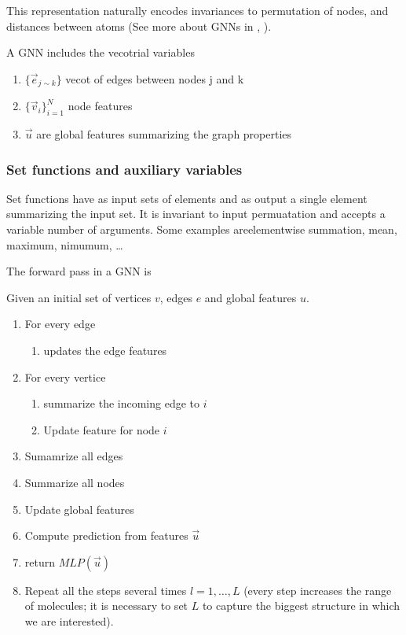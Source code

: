 \documentclass[b5paper]{report}
\begin{document}
This representation naturally encodes invariances to permutation of nodes, and
distances between atoms (See more about \glspl{GNN} in \cite{scarselli2009graph},
\cite{li2018learning}).

A \gls{GNN} includes the vecotrial variables

\begin{enumerate}
  \item $\{\vec{e}_{j\sim k}\}$ vecot of edges between nodes j and k
  \item $\{\vec{v}_i\}_{i=1}^N$ node features
  \item $\vec{u}$ are global features summarizing the graph properties
\end{enumerate}

\subsubsection{Set functions and auxiliary variables}

Set functions have as input sets of elements and as output a single element
summarizing the input set. It is invariant to input permuatation and accepts a
variable number of arguments. Some examples areelementwise summation, mean,
maximum, nimumum, \dots

The forward pass in a \gls{GNN} is

Given an initial set of vertices $v$, edges $e$ and global features $u$.

\begin{enumerate}
  \item For every edge
    \begin{enumerate}
      \item  updates the edge features
    \end{enumerate}
  \item For every vertice
    \begin{enumerate}
      \item summarize the incoming edge to $i$
      \item Update feature for node $i$
    \end{enumerate}
  \item Sumamrize all edges
  \item Summarize all nodes
  \item Update global features
  \item Compute prediction from features $\vec{u}$
  \item return $MLP(\vec{u})$
  \item Repeat all the steps several times $l=1,\dots,L$ (every step increases
    the range of molecules; it is necessary to set $L$ to capture the biggest
  structure in which we are interested).
\end{enumerate}
\end{document}

